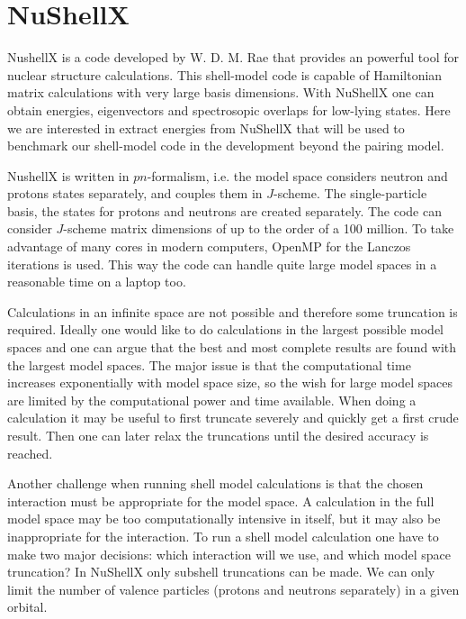 \documentclass[twoside]{article}
\begin{document}
\section{NuShellX}
\label{sec: NushellX}

NushellX is a code developed by W. D. M. Rae \cite{ref: nushellx} that provides an powerful tool for nuclear structure calculations. This shell-model code is capable of Hamiltonian matrix calculations with very large basis dimensions. With NuShellX one can obtain energies, eigenvectors and spectrosopic overlaps for low-lying states. Here we are interested in extract energies from NuShellX that will be used to benchmark our shell-model code in the development beyond the pairing model. 

NushellX is written in $pn$-formalism, i.e. the model space considers neutron and protons states separately, and couples them in $J$-scheme. The single-particle basis, the states for protons and neutrons are created separately. The code can consider $J$-scheme matrix dimensions of up to the order of a 100 million. To take advantage of many cores in modern computers, OpenMP for the Lanczos iterations is used. This way the code can handle quite large model spaces in a reasonable time on a laptop too.  

Calculations in an infinite space are not possible and therefore some truncation is required. Ideally one would like to do calculations in the largest possible model spaces and one can argue that the best and most complete results are found with the largest model spaces. The major issue is that the computational time increases exponentially with model space size, so the wish for large model spaces are limited by the computational power and time available. When doing a calculation it may be useful to first truncate severely and quickly get a first crude result. Then one can later relax the truncations until the desired accuracy is reached. 

Another challenge when running shell model calculations is that the chosen interaction must be appropriate for the model space. A calculation in the full model space may be too computationally intensive in itself, but it may also be inappropriate for the interaction. To run a shell model calculation one have to make two major decisions: which interaction will we use, and which model space truncation? In NuShellX only subshell truncations can be made. We can only limit the number of valence particles (protons and neutrons separately) in a given orbital. %
\end{document}
